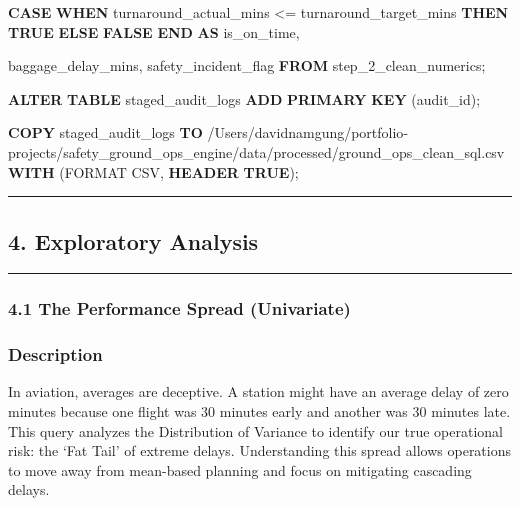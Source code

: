 \documentclass[
  letterpaper,
  DIV=11,
  numbers=noendperiod]{scrartcl}
\newenvironment{Shaded}{\begin{snugshade}}{\end{snugshade}}
\newcommand{\ControlFlowTok}[1]{\textcolor[rgb]{0.00,0.23,0.31}{\textbf{#1}}}
\newcommand{\KeywordTok}[1]{\textcolor[rgb]{0.00,0.23,0.31}{\textbf{#1}}}
\newcommand{\NormalTok}[1]{\textcolor[rgb]{0.00,0.23,0.31}{#1}}
\newcommand{\OperatorTok}[1]{\textcolor[rgb]{0.37,0.37,0.37}{#1}}
\newcommand{\StringTok}[1]{\textcolor[rgb]{0.13,0.47,0.30}{#1}}
\begin{document}
\begin{Shaded}
\begin{Highlighting}[]
    \ControlFlowTok{CASE} 
        \ControlFlowTok{WHEN}\NormalTok{ turnaround\_actual\_mins }\OperatorTok{\textless{}=}\NormalTok{ turnaround\_target\_mins }\ControlFlowTok{THEN} \KeywordTok{TRUE} 
        \ControlFlowTok{ELSE} \KeywordTok{FALSE} 
    \ControlFlowTok{END} \KeywordTok{AS}\NormalTok{ is\_on\_time,}
    
\NormalTok{    baggage\_delay\_mins,}
\NormalTok{    safety\_incident\_flag}
\KeywordTok{FROM}\NormalTok{ step\_2\_clean\_numerics;}

\KeywordTok{ALTER} \KeywordTok{TABLE}\NormalTok{ staged\_audit\_logs }\KeywordTok{ADD} \KeywordTok{PRIMARY} \KeywordTok{KEY}\NormalTok{ (audit\_id);}


\KeywordTok{COPY}\NormalTok{ staged\_audit\_logs }
\KeywordTok{TO} \StringTok{\textquotesingle{}/Users/davidnamgung/portfolio{-}projects/safety\_ground\_ops\_engine/data/processed/ground\_ops\_clean\_sql.csv\textquotesingle{}} 
\KeywordTok{WITH}\NormalTok{ (FORMAT CSV, }\KeywordTok{HEADER} \KeywordTok{TRUE}\NormalTok{);}
\end{Highlighting}
\end{Shaded}

\begin{center}\rule{0.5\linewidth}{0.5pt}\end{center}

\subsection{4. Exploratory Analysis}\label{exploratory-analysis}

\begin{center}\rule{0.5\linewidth}{0.5pt}\end{center}

\subsubsection{4.1 The Performance Spread
(Univariate)}\label{the-performance-spread-univariate}

\subsubsection{Description}

In aviation, averages are deceptive. A station might have an average
delay of zero minutes because one flight was 30 minutes early and
another was 30 minutes late. This query analyzes the Distribution of
Variance to identify our true operational risk: the `Fat Tail' of
extreme delays. Understanding this spread allows operations to move away
from mean-based planning and focus on mitigating cascading delays.
\end{document}

